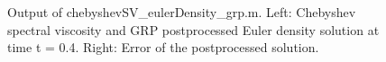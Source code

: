 \documentclass[12pt]{article}
\begin{document}
\begin{figure}[tbh]
   \centering
 \caption{Output of chebyshevSV\_eulerDensity\_grp.m.  Left: Chebyshev spectral viscosity and GRP postprocessed Euler density solution at time t = 0.4. Right: Error of the postprocessed solution.
          } \label{fig:eulerDensityGrpExample}
 \end{figure}
\end{document}
